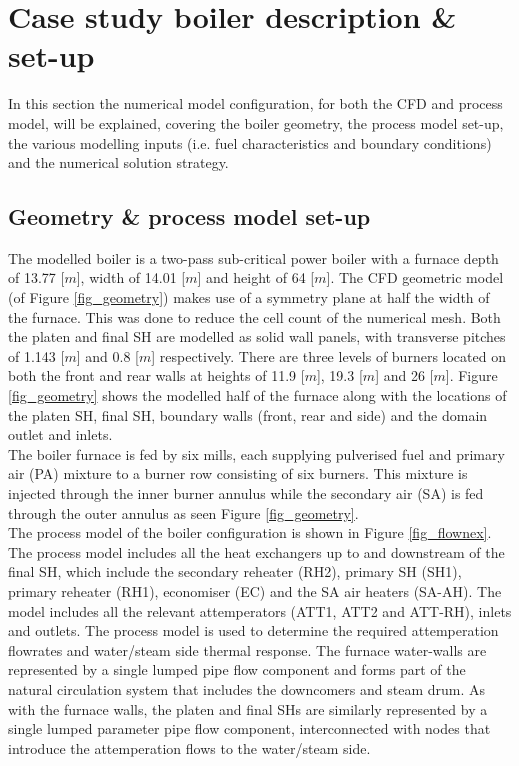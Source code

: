 \documentclass[twocolumn,10pt]{asme2ej}
\begin{document}
\section{Case study boiler description \& set-up}
In this section the numerical model configuration, for both the CFD and process model, will be explained, covering the boiler geometry, the process model set-up, the various  modelling inputs (i.e. fuel characteristics and boundary conditions) and the numerical solution strategy.

\subsection{Geometry \& process model set-up}
The modelled  boiler is a two-pass sub-critical power boiler with a furnace depth of 13.77 [$m$], width of 14.01 [$m$] and height of 64 [$m$]. The CFD geometric model (of Figure \ref{fig_geometry}) makes use of a symmetry plane at half the width of the furnace. This was done to reduce the cell count of the numerical mesh. Both the platen and final SH are modelled as solid wall panels, with transverse pitches of 1.143 [$m$] and 0.8 [$m$] respectively. There are three levels of burners located on both the front and rear walls at heights of 11.9 [$m$], 19.3 [$m$] and 26 [$m$]. Figure \ref{fig_geometry} shows the modelled half of the furnace along with the locations of the platen SH, final SH, boundary walls (front, rear and side) and the domain outlet and inlets.\\

The boiler furnace is fed by six mills, each supplying pulverised fuel and primary air (PA) mixture to a burner row consisting of six burners. This mixture is injected through the inner burner annulus while the secondary air (SA) is fed through the outer annulus as seen Figure \ref{fig_geometry}.\\ 

The process model of the boiler configuration is shown in Figure \ref{fig_flownex}. The process model includes all the heat exchangers up to and downstream of the final SH, which include the secondary reheater (RH2), primary SH (SH1), primary reheater (RH1), economiser (EC) and the SA air heaters (SA-AH). The model includes all the relevant attemperators (ATT1, ATT2 and ATT-RH), inlets and outlets. The process model is used to determine the required attemperation flowrates and water/steam side thermal response. The furnace water-walls are represented by a single lumped pipe flow component and forms part of the natural circulation system that includes the downcomers and steam drum. As with the furnace walls, the platen and final SHs are similarly represented by a single lumped parameter pipe flow component, interconnected with nodes that introduce the attemperation flows to the water/steam side.\\ 
\end{document}
